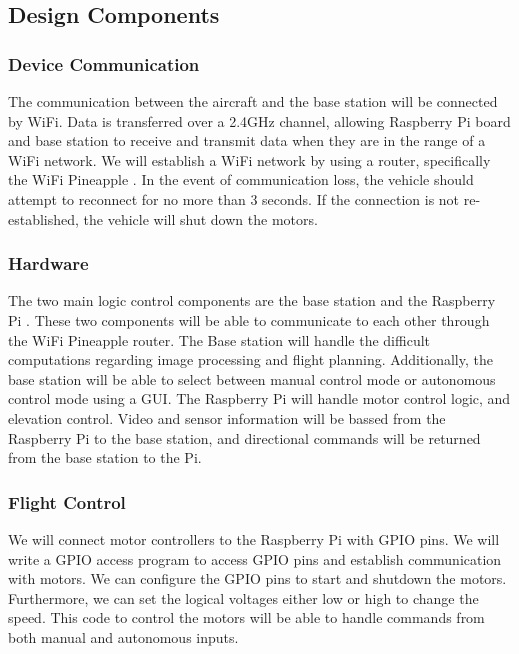 \documentclass[onecolumn, draftclsnofoot,10pt, compsoc]{IEEEtran}
\begin{document}
\subsection{Design Components}

\subsubsection{Device Communication} 

The communication between the aircraft and the base station will be connected by WiFi. Data is transferred over a 2.4GHz channel, allowing Raspberry Pi board and base station to receive and transmit data when they are in the range of a WiFi network. We will establish a WiFi network by using a router, specifically the WiFi Pineapple \cite{r12}. In the event of communication loss, the vehicle should attempt to reconnect for no more than 3 seconds. If the connection is not re-established, the vehicle will shut down the motors. 


\subsubsection{Hardware}

The two main logic control components are the base station and the Raspberry Pi \cite{r3}. These two components will be able to communicate to each other through the WiFi Pineapple router. The Base station will handle the difficult computations regarding image processing and flight planning. Additionally, the base station will be able to select between manual control mode or autonomous control mode using a GUI. The Raspberry Pi will handle motor control logic, and elevation control. Video and sensor information will be bassed from the Raspberry Pi to the base station, and directional commands will be returned from the base station to the Pi. 


\subsubsection{Flight Control}

We will connect motor controllers to the Raspberry Pi with GPIO pins. We will write a GPIO access program to access GPIO pins and establish communication with motors. We can configure the GPIO pins to start and shutdown the motors. Furthermore, we can set the logical voltages either low or high to change the speed. This code to control the motors will be able to handle commands from both manual and autonomous inputs.
\end{document}
